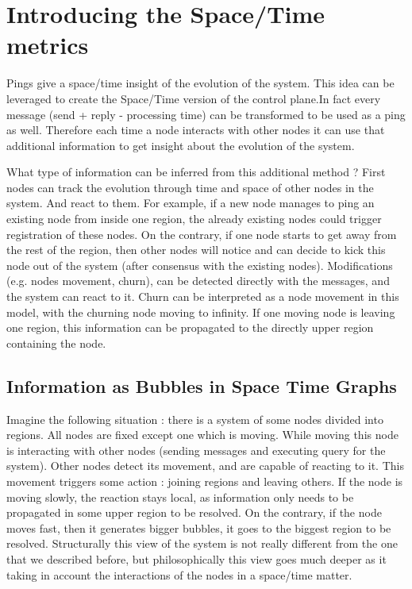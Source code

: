 \documentclass[a4paper,11pt,oneside]{report}
\begin{document}

\section{Introducing the Space/Time metrics}

Pings give a space/time insight of the evolution of the system.  This idea can
be leveraged to create the Space/Time version of the control plane.In fact
every message (send + reply - processing time) can be transformed to be used as
a ping as well. Therefore each time a node interacts with other nodes it can
use that additional information to get insight about the evolution of the
system. 

What type of information can be inferred from this additional method ? First
nodes can track the evolution through time and space of other nodes in the
system. And react to them. For example, if a new node manages to ping an
existing node from inside one region, the already existing nodes could trigger
registration of these nodes. On the contrary, if one node starts to get away
from the rest of the region, then other nodes will notice and can decide to
kick this node out of the system (after consensus with the existing nodes).
Modifications (e.g. nodes movement, churn), can be detected directly with the
messages, and the system can react to it. Churn can be interpreted as a node
movement in this model, with the churning node moving to infinity. If one
moving node is leaving one region, this information can be propagated to the
directly upper region containing the node. 

\subsection{Information as Bubbles in Space Time Graphs}

Imagine the following situation : there is a system of some nodes divided into
regions. All nodes are fixed except one which is moving. While moving this node
is interacting with other nodes (sending messages and executing query for the
system). Other nodes detect its movement, and are capable of reacting to it.
This movement triggers some action : joining regions and leaving others. If the
node is moving slowly, the reaction stays local, as information only needs to
be propagated in some upper region to be resolved. On the contrary, if the node
moves fast, then it generates bigger bubbles, it goes to the biggest region to
be resolved.  Structurally this view of the system is not really different from
the one that we described before, but philosophically this view goes much
deeper as it taking in account the interactions of the nodes in a space/time
matter.
\end{document}
